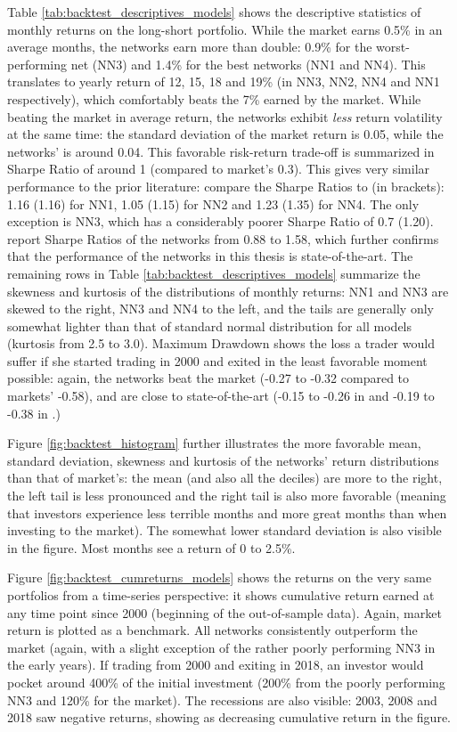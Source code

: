 		Table \ref{tab:backtest_descriptives_models} shows the descriptive statistics of monthly returns on the long-short portfolio. While the market earns 0.5\% in an average months, the networks earn more than double: 0.9\% for the worst-performing net (NN3) and 1.4\% for the best networks (NN1 and NN4). This translates to yearly return of 12, 15, 18 and 19\% (in NN3, NN2, NN4 and NN1 respectively), which comfortably beats the 7\% earned by the market. While beating the market in average return, the networks exhibit \textit{less} return volatility at the same time: the standard deviation of the market return is 0.05, while the networks' is around 0.04. This favorable risk-return trade-off is summarized in Sharpe Ratio of around 1 (compared to market's 0.3). This gives very similar performance to the prior literature: compare the Sharpe Ratios to \cite{gu2020empirical} (in brackets): 1.16 (1.16) for NN1, 1.05 (1.15) for NN2 and  1.23 (1.35) for NN4. The only exception is NN3, which has a considerably poorer Sharpe Ratio of 0.7 (1.20). \cite{tobek2020does} report Sharpe Ratios of the networks from 0.88 to 1.58, which further confirms that the performance of the networks in this thesis is state-of-the-art. The remaining rows in Table \ref{tab:backtest_descriptives_models} summarize the skewness and kurtosis of the distributions of monthly returns: NN1 and NN3 are skewed to the right, NN3 and NN4 to the left, and the tails are generally only somewhat lighter than that of standard normal distribution for all models (kurtosis from 2.5 to 3.0). Maximum Drawdown shows the loss a trader would suffer if she started trading in 2000 and exited in the least favorable moment possible: again, the networks beat the market (-0.27 to -0.32 compared to markets' -0.58), and are close to state-of-the-art (-0.15 to -0.26 in \cite{gu2020empirical} and -0.19 to -0.38 in \cite{tobek2020does}.)   
		
		Figure \ref{fig:backtest_histogram} further illustrates the more favorable mean, standard deviation, skewness and kurtosis of the networks' return distributions than that of market's: the mean (and also all the deciles) are more to the right, the left tail is less pronounced and the right tail is also more favorable (meaning that investors experience less terrible months and more great months than when investing to the market). The somewhat lower standard deviation is also visible in the figure. Most months see a return of 0 to 2.5\%.       
		
		Figure \ref{fig:backtest_cumreturns_models} shows the returns on the very same portfolios from a time-series perspective: it shows cumulative return earned at any time point since 2000 (beginning of the out-of-sample data). Again, market return is plotted as a benchmark. All networks consistently outperform the market (again, with a slight exception of the rather poorly performing NN3 in the early years). If trading from 2000 and exiting in 2018, an investor would pocket around 400\% of the initial investment (200\% from the poorly performing NN3 and 120\% for the market). The recessions are also visible: 2003, 2008 and 2018 saw negative returns, showing as decreasing cumulative return in the figure.      
		 
